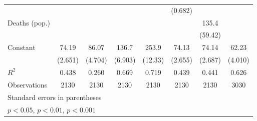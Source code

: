 \documentclass{article}
\begin{document}
{\begin{longtable}{l*{7}{c}}
                &                  &                  &                  &                  &  (0.682)         &                  &                  \\
Deaths (pop.)   &                  &                  &                  &                  &                  &    135.4\sym{*}  &                  \\
                &                  &                  &                  &                  &                  &  (59.42)         &                  \\
Constant        &    74.19\sym{***}&    86.07\sym{***}&    136.7\sym{***}&    253.9\sym{***}&    74.13\sym{***}&    74.14\sym{***}&    62.23\sym{***}\\
                &  (2.651)         &  (4.704)         &  (6.903)         &  (12.33)         &  (2.655)         &  (2.687)         &  (4.010)         \\
\hline
\(R^{2}\)       &    0.438         &    0.260         &    0.669         &    0.719         &    0.439         &    0.441         &    0.626         \\
Observations    &     2130         &     2130         &     2130         &     2130         &     2130         &     2130         &     3030         \\
\hline\hline
\multicolumn{8}{l}{\footnotesize Standard errors in parentheses}\\
\multicolumn{8}{l}{\footnotesize \sym{*} \(p<0.05\), \sym{**} \(p<0.01\), \sym{***} \(p<0.001\)}\\
\end{longtable}
}
\end{document}
